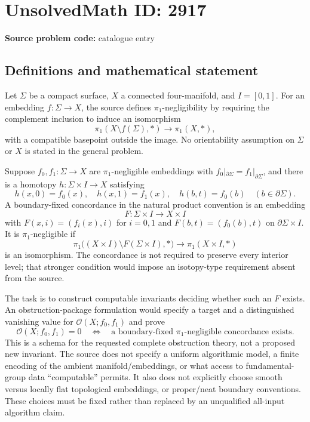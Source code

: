 \documentclass[11pt]{article}
\begin{document}
\section*{UnsolvedMath ID: 2917}
\textbf{Source problem code:} catalogue entry
\subsection{Definitions and mathematical statement}
Let $\Sigma$ be a compact surface, $X$ a connected four-manifold, and $I=[0,1]$. For an embedding $f:\Sigma\to X$, the source defines $\pi_1$-negligibility by requiring the complement inclusion to induce an isomorphism
\[
 \pi_1(X\setminus f(\Sigma),*)\longrightarrow\pi_1(X,*),
\]
with a compatible basepoint outside the image. No orientability assumption on $\Sigma$ or $X$ is stated in the general problem.

Suppose $f_0,f_1:\Sigma\to X$ are $\pi_1$-negligible embeddings with $f_0|_{\partial\Sigma}=f_1|_{\partial\Sigma}$, and there is a homotopy $h:\Sigma\times I\to X$ satisfying
\[
 h(x,0)=f_0(x),\quad h(x,1)=f_1(x),\quad
 h(b,t)=f_0(b)\quad(b\in\partial\Sigma).
\]
A boundary-fixed concordance in the natural product convention is an embedding
\[
 F:\Sigma\times I\longrightarrow X\times I
\]
with $F(x,i)=(f_i(x),i)$ for $i=0,1$ and $F(b,t)=(f_0(b),t)$ on $\partial\Sigma\times I$. It is $\pi_1$-negligible if
\[
 \pi_1\bigl((X\times I)\setminus F(\Sigma\times I),*\bigr)
       \longrightarrow\pi_1(X\times I,*)
\]
is an isomorphism. The concordance is not required to preserve every interior level; that stronger condition would impose an isotopy-type requirement absent from the source.

The task is to construct computable invariants deciding whether such an $F$ exists. An obstruction-package formulation would specify a target and a distinguished vanishing value for $\mathcal O(X;f_0,f_1)$ and prove
\[
 \mathcal O(X;f_0,f_1)=0
 \quad\Longleftrightarrow\quad
 \text{a boundary-fixed $\pi_1$-negligible concordance exists}.
\]
This is a schema for the requested complete obstruction theory, not a proposed new invariant. The source does not specify a uniform algorithmic model, a finite encoding of the ambient manifold/embeddings, or what access to fundamental-group data ``computable'' permits. It also does not explicitly choose smooth versus locally flat topological embeddings, or proper/neat boundary conventions. These choices must be fixed rather than replaced by an unqualified all-input algorithm claim.
\end{document}
